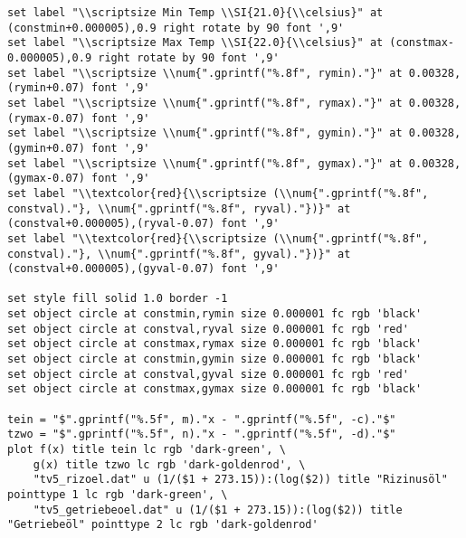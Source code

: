 {\begin{verbatim}
set label "\\scriptsize Min Temp \\SI{21.0}{\\celsius}" at (constmin+0.000005),0.9 right rotate by 90 font ',9'
set label "\\scriptsize Max Temp \\SI{22.0}{\\celsius}" at (constmax-0.000005),0.9 right rotate by 90 font ',9'
set label "\\scriptsize \\num{".gprintf("%.8f", rymin)."}" at 0.00328,(rymin+0.07) font ',9'
set label "\\scriptsize \\num{".gprintf("%.8f", rymax)."}" at 0.00328,(rymax-0.07) font ',9'
set label "\\scriptsize \\num{".gprintf("%.8f", gymin)."}" at 0.00328,(gymin+0.07) font ',9'
set label "\\scriptsize \\num{".gprintf("%.8f", gymax)."}" at 0.00328,(gymax-0.07) font ',9'
set label "\\textcolor{red}{\\scriptsize (\\num{".gprintf("%.8f", constval)."}, \\num{".gprintf("%.8f", ryval)."})}" at (constval+0.000005),(ryval-0.07) font ',9' 
set label "\\textcolor{red}{\\scriptsize (\\num{".gprintf("%.8f", constval)."}, \\num{".gprintf("%.8f", gyval)."})}" at (constval+0.000005),(gyval-0.07) font ',9' 

set style fill solid 1.0 border -1
set object circle at constmin,rymin size 0.000001 fc rgb 'black'
set object circle at constval,ryval size 0.000001 fc rgb 'red'
set object circle at constmax,rymax size 0.000001 fc rgb 'black'
set object circle at constmin,gymin size 0.000001 fc rgb 'black'
set object circle at constval,gyval size 0.000001 fc rgb 'red'
set object circle at constmax,gymax size 0.000001 fc rgb 'black'

tein = "$".gprintf("%.5f", m)."x - ".gprintf("%.5f", -c)."$"
tzwo = "$".gprintf("%.5f", n)."x - ".gprintf("%.5f", -d)."$"
plot f(x) title tein lc rgb 'dark-green', \
    g(x) title tzwo lc rgb 'dark-goldenrod', \
    "tv5_rizoel.dat" u (1/($1 + 273.15)):(log($2)) title "Rizinusöl" pointtype 1 lc rgb 'dark-green', \
    "tv5_getriebeoel.dat" u (1/($1 + 273.15)):(log($2)) title "Getriebeöl" pointtype 2 lc rgb 'dark-goldenrod'

        \end{verbatim}
    }
